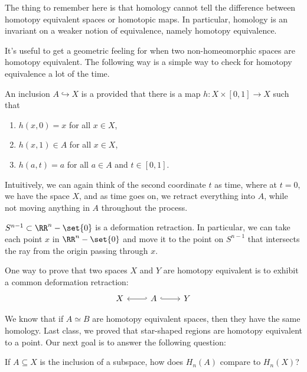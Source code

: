 \documentclass{standalone}
\begin{document}
\begin{fact}
  The thing to remember here is that homology cannot tell the difference
  between homotopy equivalent spaces or homotopic maps. In particular,
  homology is an invariant on a weaker notion of equivalence, namely
  homotopy equivalence.
\end{fact}

It's useful to get a geometric feeling for when two non-homeomorphic spaces
are homotopy equivalent. The following way is a simple way to check for
homotopy equivalence a lot of the time.

\begin{definition}
  An inclusion \(A \hookrightarrow X\) is a 
  provided that there is a map \(h \colon X \times [0, 1] \to X\) such that
  \begin{enumerate}[nosep]
    \item \(h(x, 0) = x\) for all \(x \in X\),
    \item \(h(x, 1) \in A\) for all \(x \in X\),
    \item \(h(a, t) = a\) for all \(a \in A\) and \(t \in [0, 1]\).
  \end{enumerate}
\end{definition}
Intuitively, we can again think of the second coordinate \(t\) as time,
where at \(t = 0\), we have the space \(X\), and as time goes on, we retract
everything into \(A\), while not moving anything in \(A\) throughout
the process.

\begin{example}
  \(S^{n-1} \subset \RR^n - \set{0}\) is a deformation retraction.
  In particular, we can take each point \(x\) in \(\RR^n - \set{0}\)
  and move it to the point on \(S^{n - 1}\) that intersects the ray from the
  origin passing through \(x\).
\end{example}

One way to prove that two spaces \(X\) and \(Y\) are homotopy equivalent is
to exhibit a common deformation retraction:
\[
  \begin{tikzcd}
    X & A \ar[l, hook'] \ar[r, hook] & Y
  \end{tikzcd}
\]

We know that if \(A \simeq B\) are homotopy equivalent spaces, then they
have the same homology.
Last class, we proved that star-shaped regions are homotopy equivalent to
a point. Our next goal is to answer the following question:
\begin{question}
  If \(A \subseteq X\) is the inclusion of a subspace, how does \(H_n(A)\)
  compare to \(H_n(X)\)?
\end{question}
\end{document}
